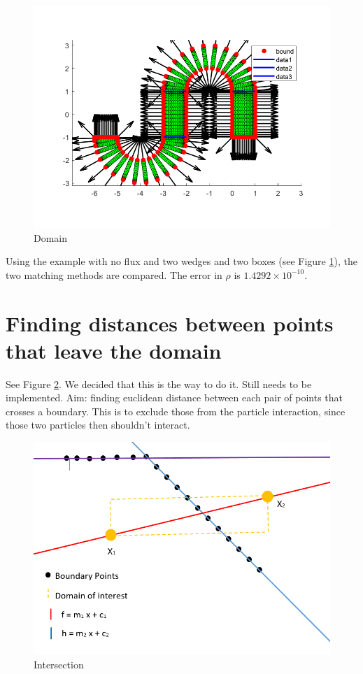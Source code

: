 \documentclass[11pt, a4paper]{article}
\theoremstyle{definition}
\begin{document}
	\begin{figure}[h]
		\centering
		\includegraphics[scale=0.5]{dom1.png}
		\caption{Domain} 
		\label{FD1}
	\end{figure}
	Using the example with no flux and two wedges and two boxes (see Figure \ref{FD1}), the two matching methods are compared. The error in $\rho$ is $1.4292\times 10^{-10}$.
	
	
	\section{Finding distances between points that leave the domain}
    See Figure \ref{FI}. We decided that this is the way to do it. Still needs to be implemented.
    Aim: finding euclidean distance between each pair of points that crosses a boundary. This is to exclude those from the particle interaction, since those two particles then shouldn't interact.
		\begin{figure}[h]
		\centering
		\includegraphics[scale=0.7]{Intersection.png}
		\caption{Intersection} 
		\label{FI}
    	\end{figure}
    
\end{document}
